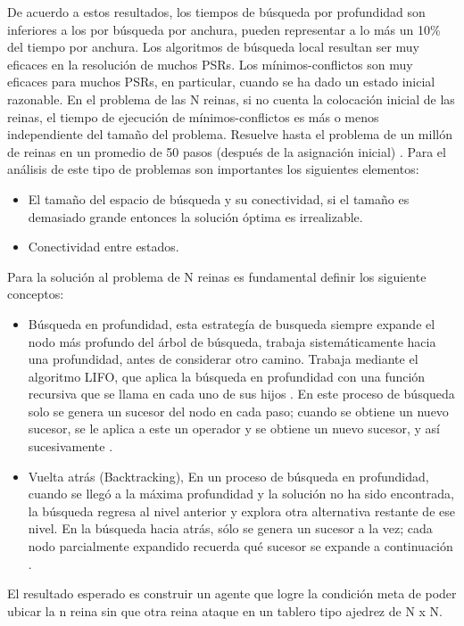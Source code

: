 \documentclass[conference]{IEEEtran}
\begin{document}
De acuerdo a estos resultados, los tiempos de búsqueda por profundidad son inferiores a los por búsqueda por anchura, pueden representar a lo más un 10\% del tiempo por anchura. 
Los algoritmos de búsqueda local resultan ser muy eficaces en la resolución de muchos PSRs. Los mínimos-conflictos son muy eficaces para muchos PSRs, en particular, cuando se ha dado un estado inicial razonable. En el problema de las N reinas, si no cuenta la colocación inicial de las reinas, el tiempo de ejecución de mínimos-conflictos es más o menos independiente del tamaño del problema. Resuelve hasta el problema de un millón de reinas en un promedio de 50 pasos (después de la asignación inicial) \cite{r2}.
Para el análisis de este tipo de problemas son importantes los siguientes elementos:
\begin{itemize}
    \item El tamaño del espacio de búsqueda y su conectividad, si el tamaño es demasiado grande entonces la solución óptima es irrealizable. 
    \item Conectividad entre estados.
\end{itemize}
Para la solución al problema de N reinas es fundamental definir los siguiente conceptos:
\begin{itemize}
    \item Búsqueda en profundidad, esta estrategía de busqueda siempre expande el nodo más profundo del árbol de búsqueda, trabaja sistemáticamente hacia una profundidad, antes de considerar otro camino. Trabaja mediante el algoritmo LIFO, que aplica la búsqueda en profundidad con una función recursiva que se llama en cada uno de sus hijos \cite{r2}. En este proceso de búsqueda solo se genera un sucesor del nodo en cada paso; cuando se obtiene un nuevo sucesor, se le aplica a este un operador y se obtiene un nuevo sucesor, y así sucesivamente \cite{r8_book_nilsson}.
\item Vuelta atrás (Backtracking), En un proceso de búsqueda en profundidad, cuando se llegó a la máxima profundidad y la solución no ha sido encontrada, la búsqueda regresa al nivel anterior y explora otra alternativa restante de ese nivel. En la búsqueda hacia atrás, sólo se genera un sucesor a la vez; cada nodo parcialmente expandido recuerda qué sucesor se expande a continuación \cite{r2}.
\end{itemize}
El resultado esperado es construir un agente que logre la condición meta de poder ubicar la n reina sin que otra reina ataque en un tablero tipo ajedrez de N x N.
\end{document}
